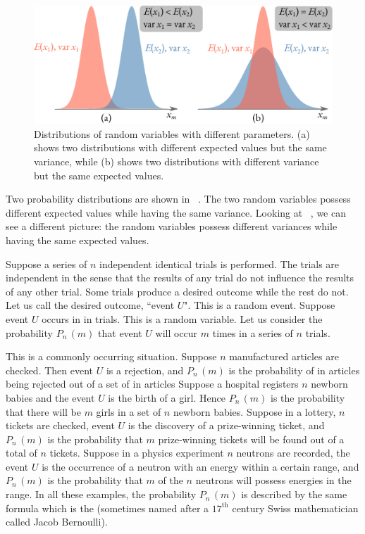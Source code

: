 \begin{figure}[!h]
 \centering
 \includegraphics[width=\textwidth]{figures/exp-val-variation.pdf}
\caption{Distributions of random variables with different
  parameters. (a) shows two distributions with different expected
  values but the same variance, while (b) shows two distributions with
  different variance but the same expected values.\label{exp-val-variation}}
 \end{figure}

Two probability distributions are shown in ~. The two random variables possess different expected values while having the same
variance. Looking at ~, we can see a different
picture: the random variables possess different variances while having
the same expected values.


  Suppose a series of $n$
independent identical trials is performed. The trials are independent
in the sense that the results of any trial do not influence the
results of any other trial. Some trials produce a desired outcome
while the rest do not. Let us call the desired outcome, ``event
$U$". This is a random event. Suppose event $U$ occurs in in trials. This
is a random variable. Let us consider the probability $P_{n}\,(m)$ that event
$U$ will occur $m$ times in a series of $n$ trials.


This is a commonly occurring situation. Suppose $n$ manufactured
articles are checked. Then event $U$ is a rejection, and $P_{n}\,(m)$ is
the probability of in articles being rejected out of a set of in
articles Suppose a hospital registers $n$ newborn babies and the event
$U$ is the birth of a girl. Hence $P_{n}\,(m)$ is the probability that
there will be $m$ girls in a set of $n$ newborn babies. Suppose in a
lottery, $n$ tickets are checked, event $U$ is the discovery of a
prize-winning ticket, and $P_{n}\,(m)$ is the probability that $m$
prize-winning tickets will be found out of a total of $n$
tickets. Suppose in a physics experiment $n$ neutrons are recorded,
the event $U$ is the occurrence of a neutron with an energy within a
certain range, and $P_{n}\,(m)$ is the probability that $m$ of the $n$
neutrons will possess energies in the range. In all these examples,
the probability  $P_{n}\,(m)$ is described by the same formula which is the
 (sometimes named after a $17^{\text{th}}$ century Swiss mathematician called Jacob Bernoulli).


